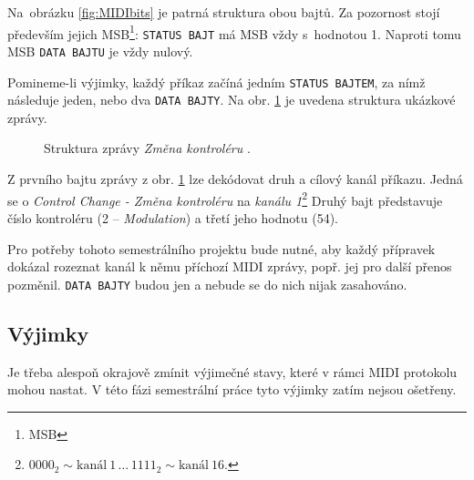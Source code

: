 Na~obrázku \ref{fig:MIDIbits} je patrná struktura obou bajtů. Za pozornost stojí především jejich \acs{MSB}\footnote{\acl{MSB}}: \texttt{STATUS~BAJT} má \acs{MSB} vždy s~hodnotou 1. Naproti tomu \acs{MSB} \texttt{DATA BAJTU} je vždy nulový.

Pomineme-li výjimky, každý příkaz začíná jedním \texttt{STATUS BAJTEM}, za nímž následuje jeden, nebo dva \texttt{DATA BAJTY}. Na obr. \ref{fig:MIDImsg} je uvedena struktura ukázkové zprávy.

\begin{figure}[h]
    \centering
    \caption{Struktura zprávy \emph{Změna kontroléru} \cite{MIDIspecs}.}
    \label{fig:MIDImsg}
\end{figure}

Z prvního bajtu zprávy z obr. \ref{fig:MIDImsg} lze dekódovat druh a cílový kanál příkazu. Jedná se o \emph{Control Change - Změna kontroléru} na \emph{kanálu 1}\footnote{$0000_2 \sim \mathrm{kanál\ 1}\,\ldots\,1111_2\sim\mathrm{kanál\ 16}$.} Druhý bajt představuje číslo kontroléru (2 -- \emph{Modulation}) a třetí jeho hodnotu (54).

Pro potřeby tohoto semestrálního projektu bude nutné, aby každý přípravek dokázal rozeznat kanál k němu příchozí \acs{MIDI} zprávy, popř. jej pro další přenos pozměnil. \texttt{DATA~BAJTY} budou jen  a nebude se do nich nijak zasahováno.

\subsection{Výjimky}\label{chpt:MIDIexcs}
Je třeba alespoň okrajově zmínit výjimečné stavy, které v rámci \acs{MIDI} protokolu mohou nastat. V této fázi semestrální práce tyto výjimky zatím nejsou ošetřeny.

